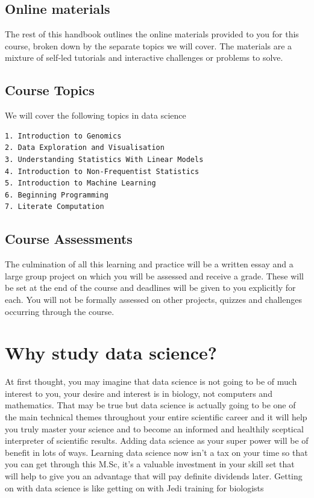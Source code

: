 \documentclass[
]{book}
\begin{document}
\hypertarget{online-materials}{%
\section{Online materials}\label{online-materials}}

The rest of this handbook outlines the online materials provided to you for this course, broken down by the separate topics we will cover. The materials are a mixture of self-led tutorials and interactive challenges or problems to solve.

\hypertarget{course-topics}{%
\section{Course Topics}\label{course-topics}}

We will cover the following topics in data science

\begin{verbatim}
1. Introduction to Genomics
2. Data Exploration and Visualisation
3. Understanding Statistics With Linear Models
4. Introduction to Non-Frequentist Statistics
5. Introduction to Machine Learning
6. Beginning Programming
7. Literate Computation
\end{verbatim}

\hypertarget{course-assessments}{%
\section{Course Assessments}\label{course-assessments}}

The culmination of all this learning and practice will be a written essay and a large group project on which you will be assessed and receive a grade. These will be set at the end of the course and deadlines will be given to you explicitly for each. You will not be formally assessed on other projects, quizzes and challenges occurring through the course.

\hypertarget{intro}{%
\chapter{Why study data science?}\label{intro}}

At first thought, you may imagine that data science is not going to be of much interest to you, your desire and interest is in biology, not computers and mathematics. That may be true but data science is actually going to be one of the main technical themes throughout your entire scientific career and it will help you truly master your science and to become an informed and healthily sceptical interpreter of scientific results. Adding data science as your super power will be of benefit in lots of ways. Learning data science now isn't a tax on your time so that you can get through this M.Sc, it's a valuable investment in your skill set that will help to give you an advantage that will pay definite dividends later. Getting on with data science is like getting on with Jedi training for biologists
\end{document}
